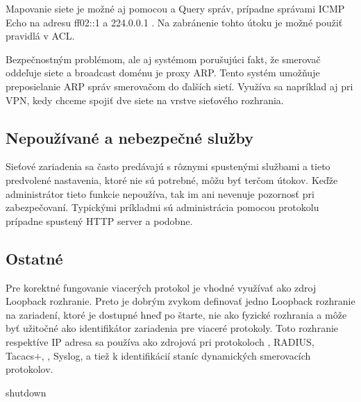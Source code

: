 Mapovanie siete je možné aj pomocou  a  Query správ, prípadne správami ICMP Echo na adresu ff02::1 a 224.0.0.1 \cite{Rey2016}\cite{Podermanski532015}. Na zabránenie tohto útoku je možné použiť pravidlá v ACL. 

Bezpečnostným problémom, ale aj systémom porušujúci fakt, že smerovač oddeľuje siete a broadcast doménu je proxy ARP. Tento systém umožňuje preposielanie ARP správ smerovačom do ďalších sietí. Využíva sa napríklad aj pri VPN, kedy chceme spojiť dve siete na vrstve sieťového rozhrania. 

\subsection*{Nepoužívané a nebezpečné služby}
Sieťové zariadenia sa často predávajú s rôznymi spustenými službami a tieto predvolené nastavenia, ktoré nie sú potrebné, môžu byť terčom útokov. Keďže administrátor tieto funkcie nepoužíva, tak im ani nevenuje pozornosť pri zabezpečovaní. Typickými príkladmi sú administrácia pomocou protokolu  prípadne spustený HTTP server a podobne. 

\subsection*{Ostatné}
Pre korektné fungovanie viacerých protokol je vhodné využívať ako zdroj Loopback rozhranie. Preto je dobrým zvykom definovať jedno Loopback rozhranie na zariadení, ktoré je dostupné hneď po štarte, nie ako fyzické rozhrania a môže byť užitočné ako identifikátor zariadenia pre viaceré protokoly. Toto rozhranie respektíve IP adresa sa používa ako zdrojová pri protokoloch , RADIUS, Tacacs+, , Syslog,  a tiež k identifikácií staníc dynamických smerovacích protokolov.

shutdown